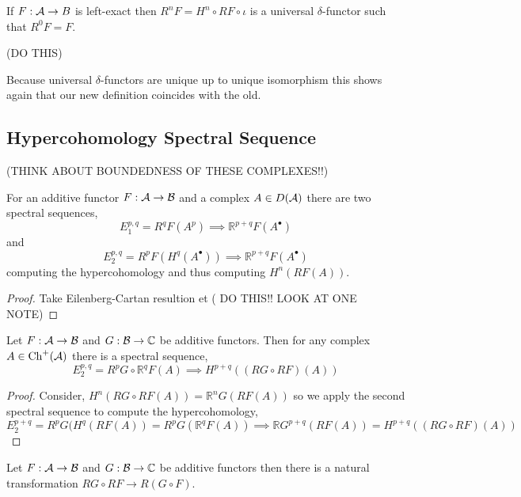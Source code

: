 \documentclass[12pt]{article}
\begin{document}
\begin{theorem}
If $F : \mathcal{A} \to B$ is left-exact then
$R^n F = H^n \circ RF \circ \iota$ is a universal $\delta$-functor such that $R^0 F = F$.
\end{theorem}

(DO THIS)

\begin{rmk}
Because universal $\delta$-functors are unique up to unique isomorphism this shows again that our new definition coincides with the old.
\end{rmk}

\subsection{Hypercohomology Spectral Sequence}

(THINK ABOUT BOUNDEDNESS OF THESE COMPLEXES!!)

\begin{prop}
For an additive functor $F : \mathcal{A} \to \mathcal{B}$ and a complex $A \in D(\mathcal{A})$ there are two spectral sequences,
\[ E^{p,q}_1 = R^q F(A^p) \implies \mathbb{R}^{p+q} F(A^\bullet) \]
and
\[ E^{p,q}_2 = R^p F(H^q(A^\bullet)) \implies \mathbb{R}^{p+q} F(A^\bullet) \]
computing the hypercohomology and thus computing $H^n(RF(A))$.
\end{prop}

\begin{proof}
Take Eilenberg-Cartan resultion et ( DO THIS!! LOOK AT ONE NOTE)
\end{proof}

\begin{corollary}
Let $F : \mathcal{A} \to \mathcal{B}$ and $G : \mathcal{B} \to \mathbb{C}$ be additive functors. Then for any complex $A \in \mathrm{Ch}^+(\mathcal{A})$ there is a spectral sequence,
\[ E^{p,q}_2 = R^p G \circ \mathbb{R}^q F(A) \implies H^{p+q}((RG \circ RF)(A)) \]
\end{corollary}

\begin{proof}
Consider, $H^n(RG \circ RF(A)) = \mathbb{R}^n G(RF(A))$ so we apply the second spectral sequence to compute the hypercohomology,
\[ E^{p+q}_2 = R^p G(H^q(RF(A)) = R^p G(\mathbb{R}^qF(A)) \implies \mathbb{R} G^{p+q}(RF(A)) = H^{p+q}((RG \circ RF)(A)) \]
\end{proof}

\begin{lemma}
Let $F : \mathcal{A} \to \mathcal{B}$ and $G : \mathcal{B} \to \mathbb{C}$ be additive functors then there is a natural transformation $R G \circ RF \to R(G \circ F)$.
\end{lemma}
\end{document}
